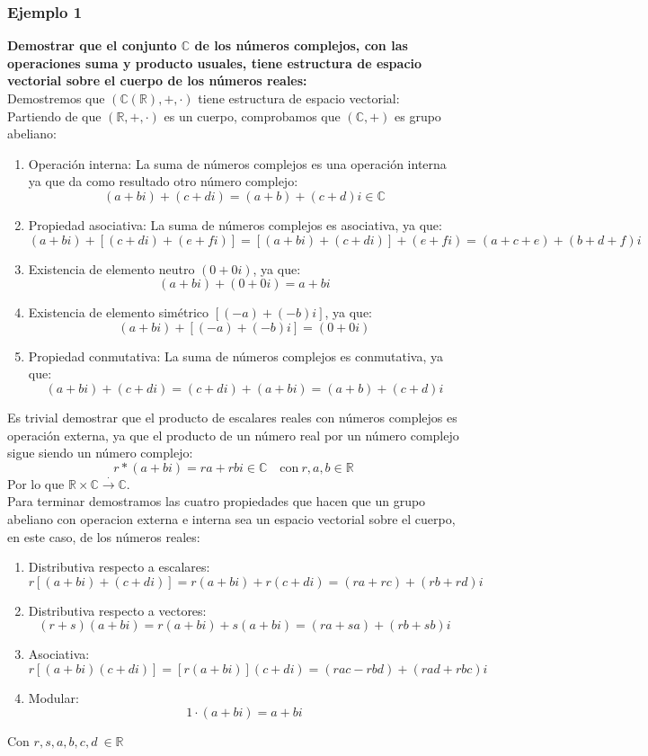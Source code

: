 \documentclass[0_algebra.tex]{subfiles}
\begin{document}
\subsubsection*{Ejemplo 1}
\textbf{Demostrar que el conjunto $\mathbb{C}$ de los números complejos, con las operaciones suma y producto usuales, tiene estructura de espacio vectorial sobre el cuerpo de los números reales:}\\
Demostremos que $(\mathbb{C}(\mathbb{R}),+,\cdot)$ tiene estructura de espacio vectorial:\\
Partiendo de que $(\mathbb{R},+,\cdot)$ es un cuerpo, comprobamos que $(\mathbb{C},+)$ es grupo abeliano:
\begin{enumerate}
\item Operación interna: La suma de números complejos es una operación interna ya que da como resultado otro número complejo:
$$
(a+bi)+(c+di)=(a+b)+(c+d)i \in \mathbb{C}
$$
\item Propiedad asociativa: La suma de números complejos es asociativa, ya que:
$$
(a+bi)+[(c+di)+(e+fi)]=[(a+bi)+(c+di)]+(e+fi)=(a+c+e)+(b+d+f)i
$$
\item Existencia de elemento neutro $(0+0i)$, ya que:
$$
(a+bi)+(0+0i)=a+bi
$$
\item Existencia de elemento simétrico $[(-a)+(-b)i]$, ya que:
$$
(a+bi)+[(-a)+(-b)i]=(0+0i)
$$
\item Propiedad conmutativa: La suma de números complejos es conmutativa, ya que:
$$
(a+bi)+(c+di)=(c+di)+(a+bi)=(a+b)+(c+d)i
$$
\end{enumerate}
Es trivial demostrar que el producto de escalares reales con números complejos es operación externa, ya que el producto de un número real por un número complejo sigue siendo un número complejo:
$$
r*(a+bi)=ra+rbi \in \mathbb{C}\quad \text{con} \ r,a,b\in \mathbb{R}
$$
Por lo que $\mathbb{R}\times \mathbb{C} \overset{\cdot}{\rightarrow} \mathbb{C}$.\\

Para terminar demostramos las cuatro propiedades que hacen que un grupo abeliano con operacion externa e interna sea un espacio vectorial sobre el cuerpo, en este caso, de los números reales:
\begin{enumerate}
\item Distributiva respecto a escalares:
$$
r[(a+bi)+(c+di)]=r(a+bi)+r(c+di)=(ra+rc)+(rb+rd)i
$$
\item Distributiva respecto a vectores:
$$
(r+s)(a+bi)=r(a+bi)+s(a+bi)=(ra+sa)+(rb+sb)i
$$
\item Asociativa:
$$
r[(a+bi)(c+di)]=[r(a+bi)](c+di)=(rac-rbd)+(rad+rbc)i
$$
\item Modular:
$$
1\cdot(a+bi)=a+bi
$$
\end{enumerate}
Con $r,s,a,b,c,d\ \in \mathbb{R}$\\
\end{document}
